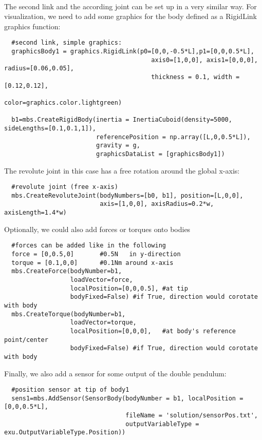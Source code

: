 \horizontalRuler\\
\noindent The second link and the according joint can be set up in a very similar way.
For visualization, we need to add some graphics for the body defined as a RigidLink graphics function:
\pythonstyle\begin{lstlisting}
  #second link, simple graphics:
  graphicsBody1 = graphics.RigidLink(p0=[0,0,-0.5*L],p1=[0,0,0.5*L], 
                                        axis0=[1,0,0], axis1=[0,0,0], radius=[0.06,0.05], 
                                        thickness = 0.1, width = [0.12,0.12], 
                                        color=graphics.color.lightgreen)

  b1=mbs.CreateRigidBody(inertia = InertiaCuboid(density=5000, sideLengths=[0.1,0.1,1]),
                         referencePosition = np.array([L,0,0.5*L]), 
                         gravity = g,
                         graphicsDataList = [graphicsBody1])
\end{lstlisting}

\noindent The revolute joint in this case has a free rotation around the global x-axis:
\pythonstyle\begin{lstlisting}
  #revolute joint (free x-axis)
  mbs.CreateRevoluteJoint(bodyNumbers=[b0, b1], position=[L,0,0], 
                          axis=[1,0,0], axisRadius=0.2*w, axisLength=1.4*w)
\end{lstlisting}

\noindent Optionally, we could also add forces or torques onto bodies
\pythonstyle\begin{lstlisting}
  #forces can be added like in the following
  force = [0,0.5,0]       #0.5N   in y-direction
  torque = [0.1,0,0]      #0.1Nm around x-axis
  mbs.CreateForce(bodyNumber=b1,
                  loadVector=force,
                  localPosition=[0,0,0.5], #at tip
                  bodyFixed=False) #if True, direction would corotate with body
  mbs.CreateTorque(bodyNumber=b1, 
                  loadVector=torque,
                  localPosition=[0,0,0],   #at body's reference point/center
                  bodyFixed=False) #if True, direction would corotate with body
\end{lstlisting}

\noindent Finally, we also add a sensor for some output of the double pendulum:
\pythonstyle\begin{lstlisting}
  #position sensor at tip of body1
  sens1=mbs.AddSensor(SensorBody(bodyNumber = b1, localPosition = [0,0,0.5*L],
                                 fileName = 'solution/sensorPos.txt',
                                 outputVariableType = exu.OutputVariableType.Position))
\end{lstlisting}
%

